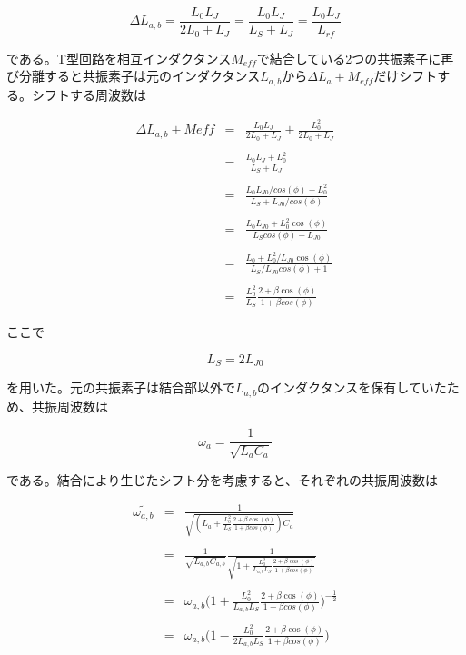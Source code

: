 \begin{equation}
    \Delta L_{a,b} = \frac{L_0L_J}{2L_0+L_J} = \frac{L_0L_J}{L_S+L_J} = \frac{L_0L_J}{L_{rf}}
\end{equation}

である。T型回路を相互インダクタンス$M_{eff}$で結合している2つの共振素子に再び分離すると共振素子は元のインダクタンス$L_{a,b}$から$\Delta L_a + M_{eff}$だけシフトする。シフトする周波数は

\begin{eqnarray}
    \Delta L_{a,b} + M{eff} & = &  \frac{L_0L_J}{2L_0+L_J} + \frac{L_0^2}{2L_0+L_J}\\ \\
    & = & \frac{L_0 L_J + L_0^2}{L_S + L_J}\\ \\
    & = & \frac{L_0 L_{J0}/cos(\phi) + L_0^2}{L_S + L_{J0}/cos(\phi)}\\ \\
    & = & \frac{L_0 L_{J0} + L_0^2 \cos(\phi)}{L_S cos(\phi) + L_{J0}}\\ \\
    & = & \frac{L_0 + L_0^2/L_{J0} \cos(\phi)}{L_S/L_{J0} cos(\phi) + 1}\\ \\
    & = & \frac{L_0^2}{L_S}\frac{2 + \beta \cos(\phi)}{1+\beta cos(\phi)}
\end{eqnarray}

ここで

\begin{equation}
    L_S = 2L_{J0}
\end{equation}

を用いた。元の共振素子は結合部以外で$L_{a,b}$のインダクタンスを保有していたため、共振周波数は

\begin{equation}
    \omega_a = \frac{1}{\sqrt{L_aC_a}}
\end{equation}

である。結合により生じたシフト分を考慮すると、それぞれの共振周波数は

\begin{eqnarray}
    \tilde{\omega_{a,b}} &=&  \frac{1}{\sqrt{(L_a+\frac{L_0^2}{L_S}\frac{2 + \beta \cos(\phi)}{1+\beta cos(\phi)})C_a}}\\ \\
    & = &  \frac{1}{\sqrt{L_{a,b}C_{a,b}}} \frac{1}{\sqrt{1+\frac{L_0^2}{L_{a,b}L_S}\frac{2 + \beta \cos(\phi)}{1+\beta cos(\phi)}}}\\ \\
    & = &  \omega_{a,b} \biggl(1+\frac{L_0^2}{L_{a,b}L_S}\frac{2 + \beta \cos(\phi)}{1+\beta cos(\phi)}\biggr)^{-\frac{1}{2}}\\ \\
    & = &  \omega_{a,b} \biggl(1-\frac{L_0^2}{2L_{a,b}L_S}\frac{2 + \beta \cos(\phi)}{1+\beta cos(\phi)}\biggr)
\end{eqnarray}

